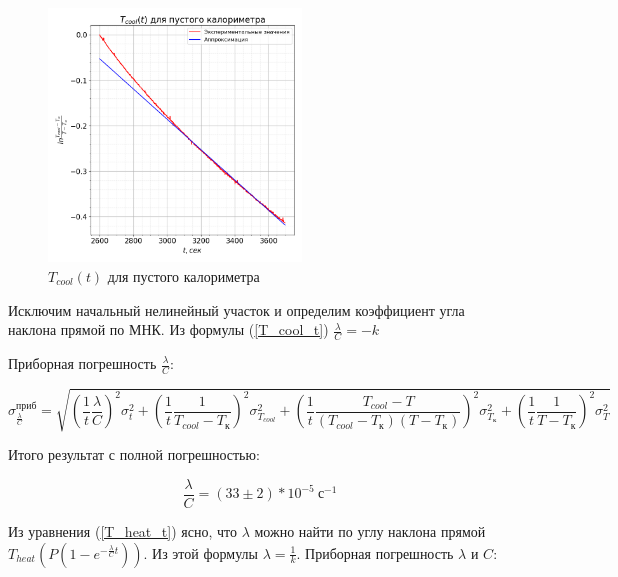 \documentclass[a4paper, 12pt]{article}
\begin{document}
                \begin{figure}[ht]
                    \centering
                    \includegraphics[width=0.6\textwidth]{img/graph_cool_1.png}
                    \caption{$T_{cool}(t)$ для пустого калориметра}
                    \label{plot:T_cool_1}
                \end{figure}

                Исключим начальный нелинейный участок и определим коэффициент угла наклона прямой по МНК. Из формулы (\ref{T_cool_t}) $\frac{\lambda}{C} = -k$

                Приборная погрешность $\frac{\lambda}{C}$:

                \begin{equation*}
                    \sigma_{\frac{\lambda}{C}}^{приб} = \sqrt{ \left( \frac{1}{t} \frac{\lambda}{C} \right)^2 \sigma_t^2 + \left( \frac{1}{t} \frac{1}{T_{cool} - T_к} \right)^2 \sigma_{T_{cool}}^2 + \left( \frac{1}{t} \frac{T_{cool} - T}{(T_{cool} - T_к)(T - T_к)} \right)^2 \sigma_{T_к}^2 + \left( \frac{1}{t} \frac{1}{T - T_к} \right)^2 \sigma_T^2}
                \end{equation*}

                Итого результат с полной погрешностью:

                \begin{equation*}
                    \frac{\lambda}{C} = (33 \pm 2)*10^{-5}~с^{-1}
                \end{equation*}

                Из уравнения (\ref{T_heat_t}) ясно, что $\lambda$ можно найти по углу наклона прямой $T_{heat}\left(P(1 - e^{- \frac{\lambda}{C} t})\right)$. Из этой формулы $\lambda = \frac{1}{k}$. Приборная погрешность $\lambda$ и $C$:
\end{document}
